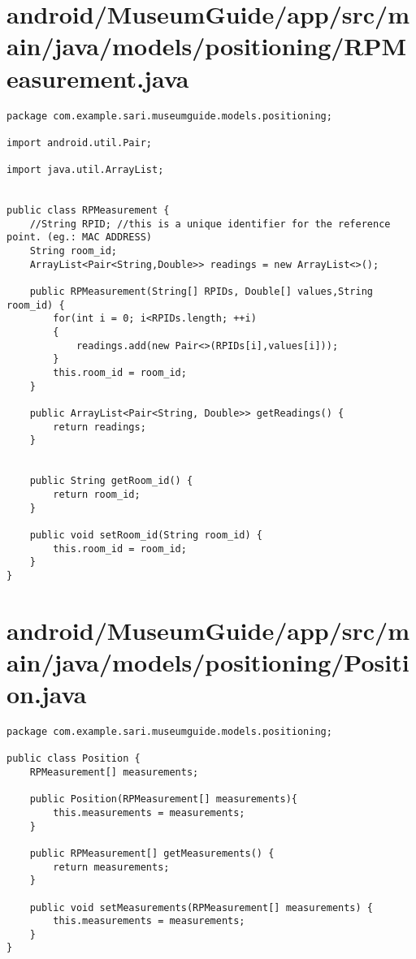 \section{android/MuseumGuide/app/src/main/java/models/positioning/RPMeasurement.java}
\begin{lstlisting}package com.example.sari.museumguide.models.positioning;

import android.util.Pair;

import java.util.ArrayList;


public class RPMeasurement {
    //String RPID; //this is a unique identifier for the reference point. (eg.: MAC ADDRESS)
    String room_id;
    ArrayList<Pair<String,Double>> readings = new ArrayList<>();

    public RPMeasurement(String[] RPIDs, Double[] values,String room_id) {
        for(int i = 0; i<RPIDs.length; ++i)
        {
            readings.add(new Pair<>(RPIDs[i],values[i]));
        }
        this.room_id = room_id;
    }

    public ArrayList<Pair<String, Double>> getReadings() {
        return readings;
    }


    public String getRoom_id() {
        return room_id;
    }

    public void setRoom_id(String room_id) {
        this.room_id = room_id;
    }
}
\end{lstlisting}
\newpage
\section{android/MuseumGuide/app/src/main/java/models/positioning/Position.java}
\begin{lstlisting}package com.example.sari.museumguide.models.positioning;

public class Position {
    RPMeasurement[] measurements;

    public Position(RPMeasurement[] measurements){
        this.measurements = measurements;
    }

    public RPMeasurement[] getMeasurements() {
        return measurements;
    }

    public void setMeasurements(RPMeasurement[] measurements) {
        this.measurements = measurements;
    }
}
\end{lstlisting}
\newpage
